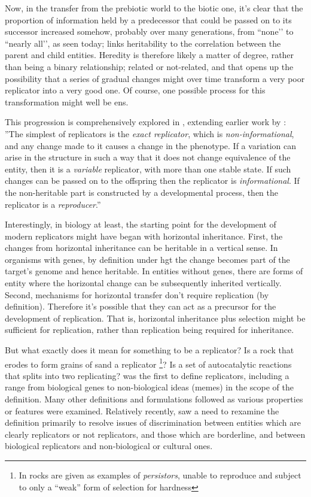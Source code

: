 Now, in the transfer from the prebiotic world to the biotic one, it’s clear that the proportion of information held by a predecessor that could be passed on to its successor increased somehow, probably over many generations, from ``none’’ to ``nearly all’’, as seen today; \cite{Vasas2012a} links heritability to the correlation between the parent and child entities. Heredity is therefore likely a matter of degree, rather than being a binary relationship; related or not-related, and that opens up the possibility that a series of gradual changes might over time transform a very poor replicator into a very good one. Of course, one possible process for this transformation might well be \gls{ens}.

This progression is comprehensively explored in \cite{Zachar2010}, extending earlier work by \cite{Szathmary1999,Szathmary:2006ty}: ''The simplest of replicators is the \emph{exact replicator}, which is \emph{non-informational}, and any change made to it causes a change in the phenotype. If a variation can arise in the structure in such a way that it does not change equivalence of the entity, then it is a \emph{variable} replicator, with more than one stable state. If such changes can be passed on to the offspring then the replicator is \emph{informational}. If the non-heritable part is constructed by a developmental process, then the replicator is a \emph{reproducer}.'' \parencite[p.21]{Zachar2010}

Interestingly, in biology at least, the starting point for the development of modern replicators might have began with horizontal inheritance. First, the changes from horizontal inheritance can be heritable in a vertical sense. In organisms with genes, by definition under \gls{hgt} the change becomes part of the target’s genome and hence heritable. In entities without genes, there are forms of entity where the horizontal change can be subsequently inherited vertically. Second, mechanisms for horizontal transfer don’t require replication (by definition). Therefore it’s possible that they can act as a precursor for the development of replication. That is, horizontal inheritance plus selection might be sufficient for replication, rather than replication being required for inheritance.

But what exactly does it mean for something to be a replicator? Is a rock that erodes to form grains of sand a replicator \footnote{In \cite{Bourrat2015} rocks are given as examples of \emph{persistors}, unable to reproduce and subject to only a ``weak'' form of selection for hardness}? Is a set of autocatalytic reactions that splits into two replicating? \Cite{Dawkins1976} was the first to define replicators, including a range from biological genes to non-biological ideas (memes) in the scope of the definition. Many other definitions and formulations followed as various properties or features were examined. Relatively recently, \cite{Zachar2010} saw a need to rexamine the definition primarily to resolve issues of discrimination between entities which are clearly replicators or not replicators, and those which are borderline, and between biological replicators and non-biological or cultural ones. 

